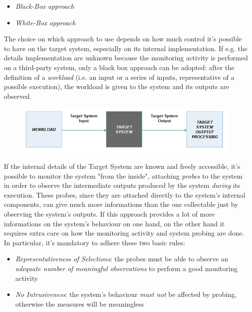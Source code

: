 \begin{itemize}
	\item \textsl{Black-Box approach}
	\item \textsl{White-Box approach}
\end{itemize}

The choice on which approach to use depends on how much control it's possible to have on the target system, especially on its internal implementation. If e.g. the details implementation are unknown because the monitoring activity is performed on a third-party system, only a black box approach can be adopted: after the definition of a \textsl{workload} (i.e. an input or a series of inputs, representative of a possible execution), the workload is given to the system and its outputs are observed.

\begin{figure}[h!]
	\includegraphics[width=\textwidth]{img/black-box.png}
	\caption{}
\end{figure}

If the internal details of the Target System are known and freely accessible, it's possible to monitor the system "from the inside", attaching \textsl{probes} to the system in order to observe the intermediate outputs produced by the system \textsl{during} its execution.
These probes, since they are attached directly to the system's internal components, can give much more informations than the one collectable just by observing the system's outputs.
If this approach provides a lot of more informations on the system's behaviour on one hand, on the other hand it requires extra care on how the monitoring activity and system probing are done. In particular, it's mandatory to adhere these two basic rules:

\begin{itemize}
	\item \textsl{Representativeness of Selections}: the probes must be able to observe an \textsl{adequate number of meaningful observations} to perform a good monitoring activity
	\item \textsl{No Intrusiveness}: the system's behaviour \textsl{must not} be affected by probing, otherwise the measures will be meaningless 
\end{itemize}


